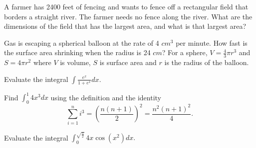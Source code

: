 \documentclass[12pt]{amsart}
\begin{document}
\newpage

\begin{thm}[10 Points]
  A farmer has 2400 feet of fencing and wants to fence off a rectangular field that borders a straight river.  The farmer needs no fence along the river.  What are the dimensions of the field that has the largest area, and what is that largest area?
\end{thm}

\vspace{3in}

\begin{thm}[10 Points]
  Gas is escaping a spherical balloon at the rate of 4 \(cm^3\) per minute.  How fast is the surface area shrinking when the radius is 24 \(cm\)?  For a sphere, \(\displaystyle{V=\frac{4}{3}\pi r^3}\) and \(\displaystyle{S=4\pi r^2}\) where \(V\) is volume, \(S\) is surface area and \(r\) is the radius of the balloon.
\end{thm}

\newpage

\begin{thm}[10 Points]
  Evaluate the integral \(\displaystyle{\int \frac{e^x}{1+e^x}dx.}\)
\end{thm}

\vspace{3in}

\begin{thm}[10 Points]
  Find \(\displaystyle{\int_0^1 4x^3dx}\) using the definition and the identity
  \[\sum_{i=1}^n i^3 = \left(\frac{n(n+1)}{2}\right)^2 = \frac{n^2(n+1)^2}{4}.\]
\end{thm}

\newpage

\begin{thm}[10 Points]
  Evaluate the integral \(\displaystyle{\int_{0}^{\sqrt{\frac{\pi}{2}}}4x\cos(x^2)dx}.\)
\end{thm}
\end{document}
